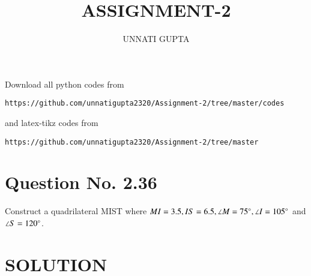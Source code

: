\documentclass[journal,12pt,twocolumn]{IEEEtran}
\begin{document}
     \def\centbox#1{\makebox[0in]{#1}}
     \def\topbox#1{\raisebox{-\baselineskip}[0in][0in]{#1}}
     \def\midbox#1{\raisebox{-0.5\baselineskip}[0in][0in]{#1}}
\vspace{3cm}
\title{ASSIGNMENT-2}
\author{UNNATI GUPTA}
\maketitle
\newpage
\bigskip
\renewcommand{\thefigure}{\theenumi}
\renewcommand{\thetable}{\theenumi}
Download all python codes from 
\begin{lstlisting}
https://github.com/unnatigupta2320/Assignment-2/tree/master/codes
\end{lstlisting}
%
and latex-tikz codes from 
%
\begin{lstlisting}
https://github.com/unnatigupta2320/Assignment-2/tree/master
\end{lstlisting}
%
\section{Question No. 2.36}
Construct a quadrilateral MIST where $MI = 3.5, IS = 6.5, \angle M = 75 \degree, \angle I = 105 \degree$ and $\angle S = 120 \degree$.
%
\section{SOLUTION}
\end{document}
